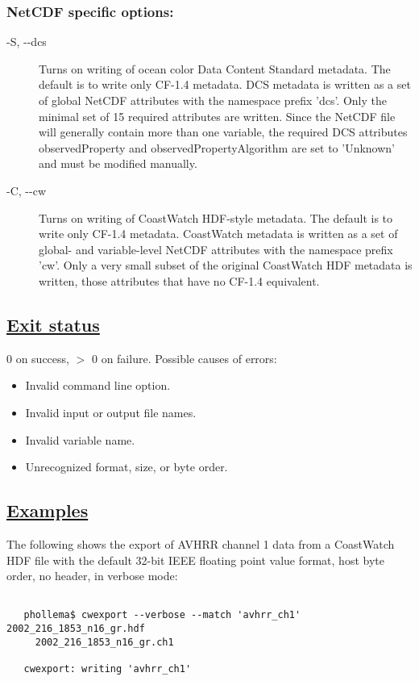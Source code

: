 \subsubsection*{NetCDF specific options:}
\begin{description}
\item[ -S, -{-}dcs ] Turns on writing of ocean color Data Content Standard metadata. The default is to write only CF-1.4 metadata. DCS metadata is written as a set of global NetCDF attributes with the namespace prefix 'dcs'. Only the minimal set of 15 required attributes are written. Since the NetCDF file will generally contain more than one variable, the required DCS attributes observedProperty and observedPropertyAlgorithm are set to 'Unknown' and must be modified manually.
\item[ -C, -{-}cw ] Turns on writing of CoastWatch HDF-style metadata. The default is to write only CF-1.4 metadata. CoastWatch metadata is written as a set of global- and variable-level NetCDF attributes with the namespace prefix 'cw'. Only a very small subset of the original CoastWatch HDF metadata is written, those attributes that have no CF-1.4 equivalent.

\end{description}
\subsection*{\underline{Exit status}}


  0 on success, $>$ 0 on failure. Possible causes of errors:
\begin{itemize}
\item  Invalid command line option. 
\item  Invalid input or output file names. 
\item  Invalid variable name. 
\item  Unrecognized format, size, or byte order. 

\end{itemize}
\subsection*{\underline{Examples}}


  The following shows the export of AVHRR channel 1 data from a CoastWatch HDF file with the default 32-bit IEEE floating point value format, host byte order, no header, in verbose mode:
\begin{verbatim}

   phollema$ cwexport --verbose --match 'avhrr_ch1' 2002_216_1853_n16_gr.hdf 
     2002_216_1853_n16_gr.ch1

   cwexport: writing 'avhrr_ch1'
 
\end{verbatim}


